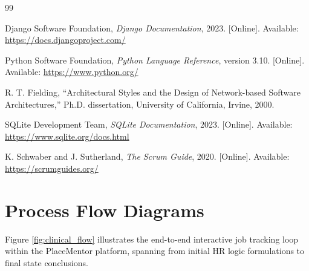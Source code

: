 \documentclass[a4paper,12pt]{report}
\begin{document}
\newpage
{}
\begin{thebibliography}{99}

Django Software Foundation, \textit{Django Documentation}, 2023. [Online]. Available: \url{https://docs.djangoproject.com/}

Python Software Foundation, \textit{Python Language Reference}, version 3.10. [Online]. Available: \url{https://www.python.org/}

R. T. Fielding, ``Architectural Styles and the Design of Network-based Software Architectures,'' Ph.D. dissertation, University of California, Irvine, 2000.

SQLite Development Team, \textit{SQLite Documentation}, 2023. [Online]. Available: \url{https://www.sqlite.org/docs.html}

K. Schwaber and J. Sutherland, \textit{The Scrum Guide}, 2020. [Online]. Available: \url{https://scrumguides.org/}

\end{thebibliography}


\newpage
\appendix
\chapter{Process Flow Diagrams}
Figure \ref{fig:clinical_flow} illustrates the end-to-end interactive job tracking loop within the PlaceMentor platform, spanning from initial HR logic formulations to final state conclusions.
\end{document}
